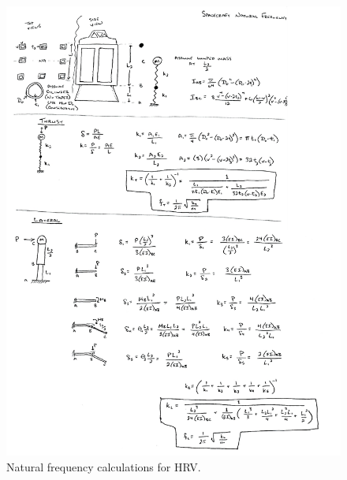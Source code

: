 \documentclass[paper=letter, fontsize=11pt]{scrartcl} %
\numberwithin{equation}{section} %
\numberwithin{figure}{section} %
\numberwithin{table}{section} %
\begin{document}
\begin{figure}[H]
    \begin{center}
    \includegraphics[width=1\textwidth]{Pics/freq.png}
    \caption{Natural frequency calculations for HRV.}
    \label{fig:p6}
    \end{center}
\end{figure}
\end{document}
